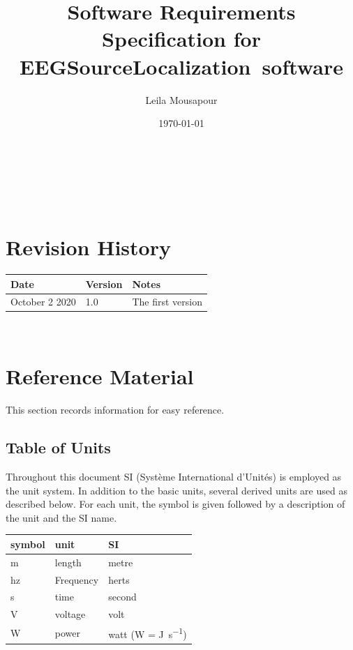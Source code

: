 \documentclass[12pt]{article}
\renewcommand{\progname}{EEGSourceLocalization}
\begin{document}
\title{Software Requirements Specification for \progname \ software} 
\author{Leila Mousapour}
\date{\today}
	
\maketitle

~\newpage


\tableofcontents

~\newpage

\section*{Revision History}

\begin{tabularx}{\textwidth}{p{3cm}p{2cm}X}
\toprule {\bf Date} & {\bf Version} & {\bf Notes}\\
\midrule
October 2  2020 & 1.0 & The first version\\
\bottomrule
\end{tabularx}

~\newpage

\section{Reference Material}

This section records information for easy reference.

\subsection{Table of Units}

Throughout this document SI (Syst\`{e}me International d'Unit\'{e}s) is employed
as the unit system.  In addition to the basic units, several derived units are
used as described below.  For each unit, the symbol is given followed by a
description of the unit and the SI name.
~\newline

\renewcommand{\arraystretch}{1.2}
  \noindent \begin{tabular}{l l l} 
    \toprule		
    \textbf{symbol} & \textbf{unit} & \textbf{SI}\\
    \midrule 
    \si{\metre} & length & metre\\
    hz & Frequency	& herts\\
    \si{\second} & time & second\\
    \si{\volt} & voltage & volt\\
    \si{\watt} & power & watt (W = \si{\joule\per\second})\\
    \bottomrule
  \end{tabular}
\end{document}
